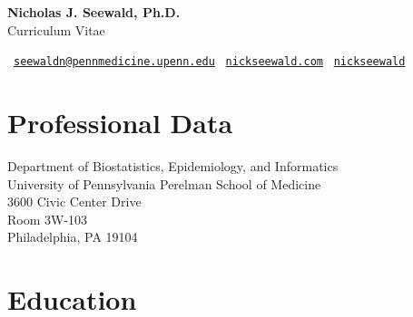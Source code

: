 \documentclass[letterpaper,11pt]{article} %
\begin{document}
 
	
	\begin{center}
		\headingfont
		\huge{\textbf{Nicholas J. Seewald, Ph.D.}} \\
		\Large{Curriculum Vitae}
	\end{center}
	
	\begin{center}
		 \  \href{mailto:nicholas.seewald@pennmedicine.upenn.edu}{\texttt{seewaldn@pennmedicine.upenn.edu}} \quad
		\faLaptop \  \href{https://www.nickseewald.com}{\texttt{nickseewald.com}} \quad
		\faGithub  \  \href{https://www.github.com/nickseewald}{\texttt{nickseewald}}
	\end{center}
	
	\thispagestyle{firstpage} %
	
	
	\section*{Professional Data}
	
	\begin{minipage}[t]{.61\textwidth}
		Department of Biostatistics, Epidemiology, and Informatics \\
		University of Pennsylvania Perelman School of Medicine \\
		3600 Civic Center Drive \\
		Room 3W-103 \\
		Philadelphia, PA 19104
	\end{minipage}
	
	
	\section*{Education}
	\vspace{-.4\textfloatsep}
	\renewcommand{\arraystretch}{1.25}
	
\end{document}
